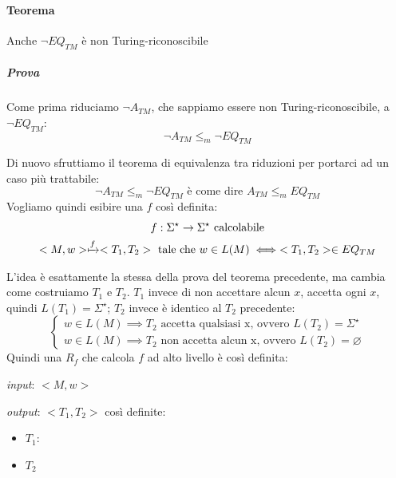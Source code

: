 \paragraph{Teorema} Anche $\neg EQ_{TM}$ è non Turing-riconoscibile

\subparagraph{Prova} Come prima riduciamo $\neg A_{TM}$, che sappiamo essere non Turing-riconoscibile, a $\neg EQ_{TM}$:
\[
	\neg A_{TM} \leq_m \neg EQ_{TM}
\]

Di nuovo sfruttiamo il teorema di equivalenza tra riduzioni per portarci ad un caso più trattabile:
\[
	\neg A_{TM} \leq_m \neg EQ_{TM} \text{ è come dire } A_{TM} \leq_m EQ_{TM}
\]
Vogliamo quindi esibire una $f$ così definita:
\begin{gather*}
	f: \Sigma^{\star} \to \Sigma^{\star} \text{ calcolabile} \\
	<M, w> \xmapsto{f} <T_1, T_2> \text{ tale che } w \in L(M) \iff <T_1, T_2> \in EQ_{TM}
\end{gather*}

L'idea è esattamente la stessa della prova del teorema precedente, ma cambia come costruiamo $T_1$ e $T_2$. $T_1$ invece di non accettare alcun $x$, accetta ogni $x$, quindi $L(T_1) = \Sigma^{\star}$; $T_2$ invece è identico al $T_2$ precedente:
\[
	\begin{cases}
		w \in L(M) \implies T_2 \text{ accetta qualsiasi x, ovvero } L(T_2) = \Sigma^{\star} \\
		w \in L(M) \implies T_2 \text{ non accetta alcun x, ovvero } L(T_2) = \varnothing
	\end{cases}
\]
Quindi una $R_f$ che calcola $f$ ad alto livello è così definita:

\begin{description}
\item \textit{input}: $<M, w>$
\item \textit{output}: $<T_1, T_2>$ così definite:
\begin{itemize}
\item $T_1$:

\item $T_2$
\end{itemize}
\end{description}


